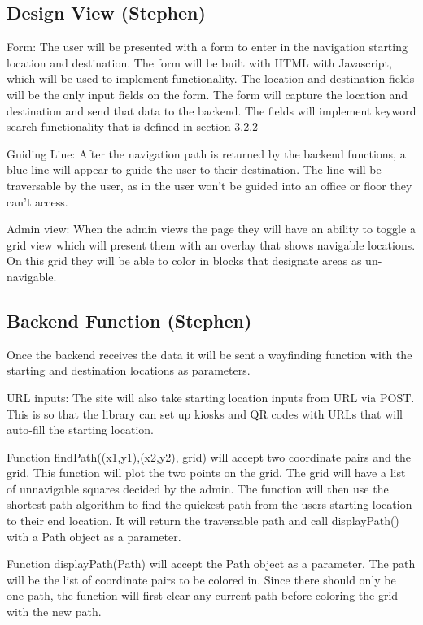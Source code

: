 \documentclass[letterpaper,10pt,titlepage, onecolumn, compsoc]{IEEEtran}
\begin{document}
\subsection{Design View (Stephen)}
Form: The user will be presented with a form to enter in the navigation starting location and destination. The form will be built with HTML with Javascript, which will be used to implement functionality. The location and destination fields will be the only input fields on the form.  The form will capture the location and destination and send that data to the backend. The fields will implement keyword search functionality that is defined in section 3.2.2
 
Guiding Line: After the navigation path is returned by the backend functions, a blue line will appear to guide the user to their destination. The line will be traversable by the user, as in the user won’t be guided into an office or floor they can’t access.
 
Admin view: When the admin views the page they will have an ability to toggle a grid view which will present them with an overlay that shows navigable locations. On this grid they will be able to color in blocks that designate areas as un-navigable.

\subsection{Backend Function (Stephen)}
Once the backend receives the data it will be sent a wayfinding function with the starting and destination locations as parameters.
 
URL inputs: The site will also take starting location inputs from URL via POST. This is so that the library can set up kiosks and QR codes with URLs that will auto-fill the starting location.
 
Function findPath((x1,y1),(x2,y2), grid) will accept two coordinate pairs and the grid. This function will plot the two points on the grid. The grid will have a list of unnavigable squares decided by the admin. The function will then use the shortest path algorithm to find the quickest path from the users starting location to their end location. It will return the traversable path and call displayPath() with a Path object as a parameter.  
 
Function displayPath(Path) will accept the Path object as a parameter. The path will be the list of coordinate pairs to be colored in. Since there should only be one path, the function will first clear any current path before coloring the grid with the new path.
 
\end{document}
